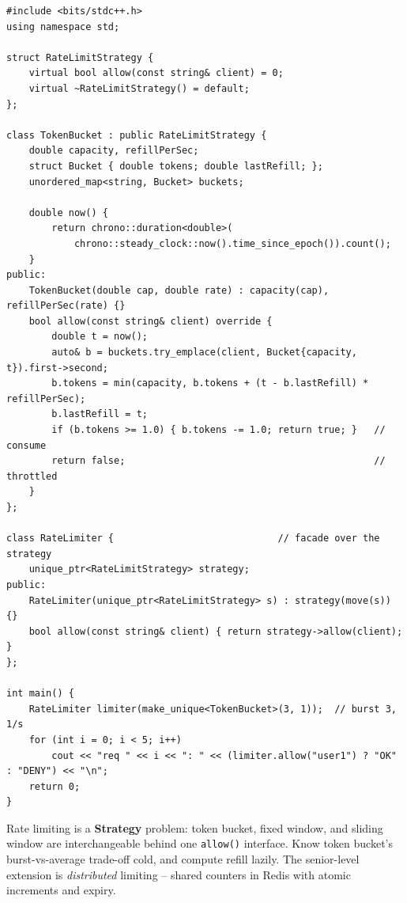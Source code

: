 \begin{lstlisting}
#include <bits/stdc++.h>
using namespace std;

struct RateLimitStrategy {
    virtual bool allow(const string& client) = 0;
    virtual ~RateLimitStrategy() = default;
};

class TokenBucket : public RateLimitStrategy {
    double capacity, refillPerSec;
    struct Bucket { double tokens; double lastRefill; };
    unordered_map<string, Bucket> buckets;

    double now() {
        return chrono::duration<double>(
            chrono::steady_clock::now().time_since_epoch()).count();
    }
public:
    TokenBucket(double cap, double rate) : capacity(cap), refillPerSec(rate) {}
    bool allow(const string& client) override {
        double t = now();
        auto& b = buckets.try_emplace(client, Bucket{capacity, t}).first->second;
        b.tokens = min(capacity, b.tokens + (t - b.lastRefill) * refillPerSec);
        b.lastRefill = t;
        if (b.tokens >= 1.0) { b.tokens -= 1.0; return true; }   // consume
        return false;                                            // throttled
    }
};

class RateLimiter {                             // facade over the strategy
    unique_ptr<RateLimitStrategy> strategy;
public:
    RateLimiter(unique_ptr<RateLimitStrategy> s) : strategy(move(s)) {}
    bool allow(const string& client) { return strategy->allow(client); }
};

int main() {
    RateLimiter limiter(make_unique<TokenBucket>(3, 1));  // burst 3, 1/s
    for (int i = 0; i < 5; i++)
        cout << "req " << i << ": " << (limiter.allow("user1") ? "OK" : "DENY") << "\n";
    return 0;
}
\end{lstlisting}

\begin{takeawaybox}
Rate limiting is a \textbf{Strategy} problem: token bucket, fixed window,
and sliding window are interchangeable behind one \texttt{allow()}
interface. Know token bucket's burst-vs-average trade-off cold, and
compute refill lazily. The senior-level extension is \emph{distributed}
limiting -- shared counters in Redis with atomic increments and expiry.
\end{takeawaybox}
